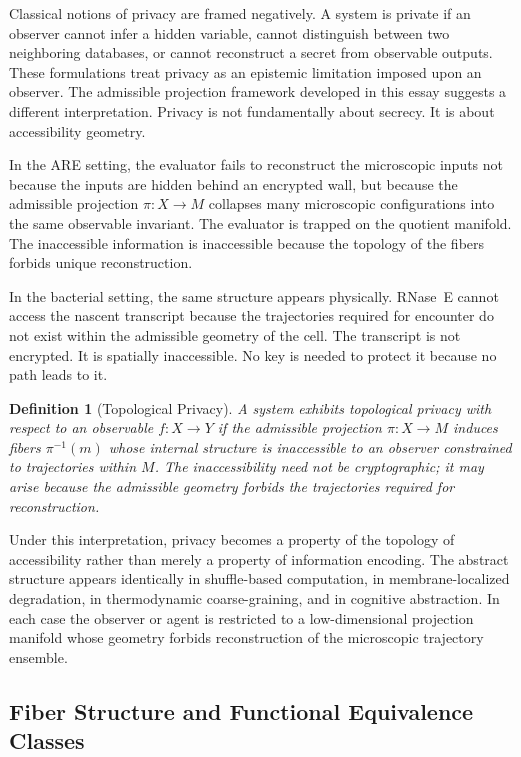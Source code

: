 \documentclass[12pt, a4paper]{article}
\theoremstyle{essaystyle}
\newtheorem{definition}{Definition}
\begin{document}
Classical notions of privacy are framed negatively. A system is private if an observer
cannot infer a hidden variable, cannot distinguish between two neighboring databases,
or cannot reconstruct a secret from observable outputs. These formulations treat privacy
as an epistemic limitation imposed upon an observer. The admissible projection framework
developed in this essay suggests a different interpretation. Privacy is not fundamentally
about secrecy. It is about accessibility geometry.

In the ARE setting, the evaluator fails to reconstruct the microscopic inputs not because
the inputs are hidden behind an encrypted wall, but because the admissible projection
$\pi : X \to M$ collapses many microscopic configurations into the same observable
invariant. The evaluator is trapped on the quotient manifold. The inaccessible
information is inaccessible because the topology of the fibers forbids unique
reconstruction.

In the bacterial setting, the same structure appears physically. RNase~E cannot access
the nascent transcript because the trajectories required for encounter do not exist
within the admissible geometry of the cell. The transcript is not encrypted. It is
spatially inaccessible. No key is needed to protect it because no path leads to it.

\begin{definition}[Topological Privacy]
A system exhibits \emph{topological privacy} with respect to an observable $f : X \to
Y$ if the admissible projection $\pi : X \to M$ induces fibers $\pi^{-1}(m)$ whose
internal structure is inaccessible to an observer constrained to trajectories within
$M$. The inaccessibility need not be cryptographic; it may arise because the admissible
geometry forbids the trajectories required for reconstruction.
\end{definition}

Under this interpretation, privacy becomes a property of the topology of accessibility
rather than merely a property of information encoding. The abstract structure appears
identically in shuffle-based computation, in membrane-localized degradation, in
thermodynamic coarse-graining, and in cognitive abstraction. In each case the observer
or agent is restricted to a low-dimensional projection manifold whose geometry forbids
reconstruction of the microscopic trajectory ensemble.

\subsection{Fiber Structure and Functional Equivalence Classes}
\end{document}
